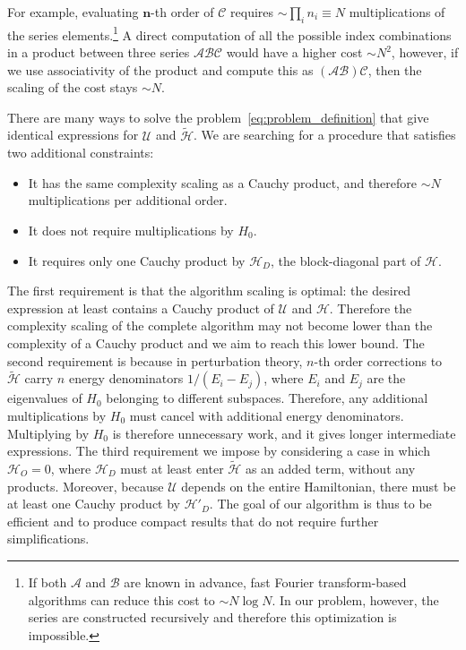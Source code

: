 For example, evaluating $\mathbf{n}$-th order of $\mathcal{C}$ requires $\sim\prod_i n_i \equiv N$ multiplications of the series elements.\footnote{If both $\mathcal{A}$ and $\mathcal{B}$ are known in advance, fast Fourier transform-based algorithms can reduce this cost to $\sim N \log N$. In our problem, however, the series are constructed recursively and therefore this optimization is impossible.}
A direct computation of all the possible index combinations in a product between three series $\mathcal{A}\mathcal{B}\mathcal{C}$ would have a higher cost $\sim N^2$, however, if we use associativity of the product and compute this as $(\mathcal{A}\mathcal{B})\mathcal{C}$, then the scaling of the cost stays $\sim N$.

There are many ways to solve the problem~\eqref{eq:problem_definition} that give identical expressions for $\mathcal{U}$ and $\tilde{\mathcal{H}}$.
We are searching for a procedure that satisfies two additional constraints:
%
\begin{itemize}
    \item It has the same complexity scaling as a Cauchy product, and therefore
    $\sim N$ multiplications per additional order.
    \item It does not require multiplications by $H_0$.
    \item It requires only one Cauchy product by $\mathcal{H}_D$, the block-diagonal
    part of $\mathcal{H}$.
\end{itemize}
%
The first requirement is that the algorithm scaling is optimal: the desired expression at least contains a Cauchy product of $\mathcal{U}$ and $\mathcal{H}$.
Therefore the complexity scaling of the complete algorithm may not become lower than the complexity of a Cauchy product and we aim to reach this lower bound.
The second requirement is because in perturbation theory, $n$-th order corrections to $\tilde{\mathcal{H}}$ carry $n$ energy denominators $1/(E_i - E_j)$, where $E_i$ and $E_j$ are the eigenvalues of $H_0$ belonging to different subspaces.
Therefore, any additional multiplications by $H_0$ must cancel with additional energy denominators.
Multiplying by $H_0$ is therefore unnecessary work, and it gives longer intermediate expressions.
The third requirement we impose by considering a case in which $\mathcal{H}_{O}=0$, where $\mathcal{H}_D$ must at least enter $\tilde{\mathcal{H}}$ as an added term, without any products.
Moreover, because $\mathcal{U}$ depends on the entire Hamiltonian, there must be at least one Cauchy product by $\mathcal{H}'_D$.
The goal of our algorithm is thus to be efficient and to produce compact results that do not require further simplifications.

